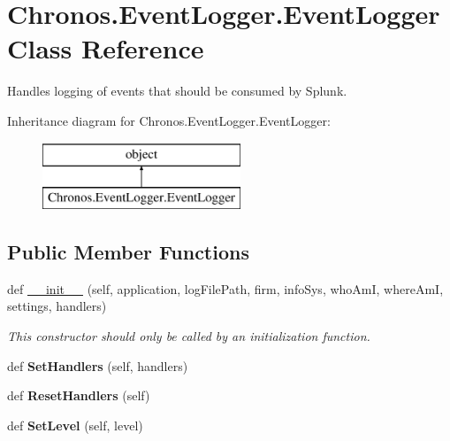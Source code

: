 \hypertarget{classChronos_1_1EventLogger_1_1EventLogger}{}\section{Chronos.\+Event\+Logger.\+Event\+Logger Class Reference}
\label{classChronos_1_1EventLogger_1_1EventLogger}


Handles logging of events that should be consumed by Splunk.  


Inheritance diagram for Chronos.\+Event\+Logger.\+Event\+Logger\+:\begin{figure}[H]
\begin{center}
\leavevmode
\includegraphics[height=2.000000cm]{classChronos_1_1EventLogger_1_1EventLogger}
\end{center}
\end{figure}
\subsection*{Public Member Functions}
\begin{DoxyCompactItemize}
\item 
def \hyperlink{group__PyInfrastructure_ga909b4948081a7832e704215ec484dea4}{\+\_\+\+\_\+init\+\_\+\+\_\+} (self, application, log\+File\+Path, firm, info\+Sys, who\+AmI, where\+AmI, settings, handlers)
\begin{DoxyCompactList}\small\item\em This constructor should only be called by an initialization function. \end{DoxyCompactList}\item 
def {\bfseries Set\+Handlers} (self, handlers)
\item 
def {\bfseries Reset\+Handlers} (self)
\item 
def {\bfseries Set\+Level} (self, level)
\end{DoxyCompactItemize}
